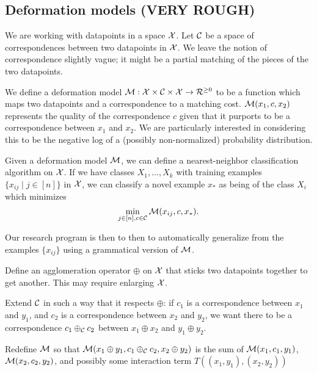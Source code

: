 
\subsection{Deformation models (VERY ROUGH)}

We are working with datapoints in a space ${\mathcal X}$. Let ${\mathcal C}$ be a
space of correspondences between two datapoints in ${\mathcal X}$.  We leave the
notion of correspondence slightly vague; it might be a partial
matching of the pieces of the two datapoints.

We define a deformation model ${\mathcal M}: {\mathcal X} \times {\mathcal C} \times {\mathcal X} \to
{\mathcal R}^{\ge 0}$ to be a function which maps two datapoints and a
correspondence to a matching cost. ${\mathcal M}(x_1, c, x_2)$ represents the
quality of the correspondence $c$ 
 given that it purports to be a
correspondence between $x_1$ and $x_2$. We are particularly interested
in considering this to be the negative log of a (possibly
non-normalized) probability distribution.

Given a deformation model ${\mathcal M}$, we can define a nearest-neighbor
classification algorithm on ${\mathcal X}$. If we have classes $X_1,\dots,X_k$ with
training examples $\{x_{ij} \mid j\in [n] \}$ in ${\mathcal X}$, we can classify a novel
example $x_*$ as being of the class $X_i$ which minimizes 
$$\min_{j\in [n], c\in {\mathcal C}} {\mathcal M}(x_{ij}, c, x_*).$$

Our research program is then to then to automatically generalize from the
examples $\{x_{ij}\}$ using a grammatical version of ${\mathcal M}$.


\bitem
\item Define an agglomeration operator $\oplus$ on ${\mathcal X}$ that sticks
  two datapoints together to get another. This may require enlarging
  ${\mathcal X}$.
\item Extend ${\mathcal C}$ in such a way that it respects $\oplus$: if $c_1$
  is a correspondence between $x_1$ and $y_1$, and $c_2$ is a
  correspondence between $x_2$ and $y_2$, we want there to be a
  correspondence $c_1 \oplus_{\mathcal C} c_2$ between $x_1\oplus x_2$ and
  $y_1\oplus y_2$.
\item Redefine ${\mathcal M}$ so that ${\mathcal M}( x_1\oplus y_1, c_1 \oplus_{\mathcal C}
  c_2, x_2\oplus y_2 )$ is the sum of ${\mathcal M}(x_1,c_1,y_1)$,
  ${\mathcal M}(x_2,c_2,y_2)$, and possibly some interaction term $T( (x_1,y_1), (x_2,y_2) )$

